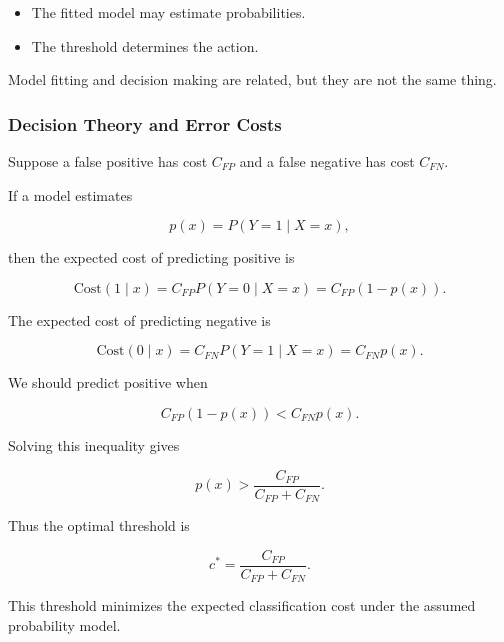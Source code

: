 \documentclass[
  letterpaper,
  DIV=11,
  numbers=noendperiod]{scrreprt}
\providecommand{\tightlist}{%
  \setlength{\itemsep}{0pt}\setlength{\parskip}{0pt}}
\theoremstyle{definition}
\theoremstyle{definition}
\theoremstyle{plain}
\theoremstyle{plain}
\theoremstyle{remark}
\begin{document}
\begin{tcolorbox}[enhanced jigsaw, arc=.35mm, bottomrule=.15mm, bottomtitle=1mm, breakable, colback=white, colbacktitle=quarto-callout-note-color!10!white, colframe=quarto-callout-note-color-frame, coltitle=black, left=2mm, leftrule=.75mm, opacityback=0, opacitybacktitle=0.6, rightrule=.15mm, title=\textcolor{quarto-callout-note-color}{\faInfo}\hspace{0.5em}{Thresholds are decisions}, titlerule=0mm, toprule=.15mm, toptitle=1mm]

\begin{itemize}
\tightlist
\item
  The fitted model may estimate probabilities.
\item
  The threshold determines the action.
\end{itemize}

Model fitting and decision making are related, but they are not the same
thing.

\end{tcolorbox}

\subsubsection{Decision Theory and Error
Costs}\label{decision-theory-and-error-costs}

Suppose a false positive has cost \(C_{FP}\) and a false negative has
cost \(C_{FN}\).

If a model estimates

\[
p(x)=P(Y=1\mid X=x),
\]

then the expected cost of predicting positive is

\[
\text{Cost}(1\mid x)
=
C_{FP}P(Y=0\mid X=x)
=
C_{FP}(1-p(x)).
\]

The expected cost of predicting negative is

\[
\text{Cost}(0\mid x)
=
C_{FN}P(Y=1\mid X=x)
=
C_{FN}p(x).
\]

We should predict positive when

\[
C_{FP}(1-p(x))
<
C_{FN}p(x).
\]

Solving this inequality gives

\[
p(x)
>
\frac{C_{FP}}{C_{FP}+C_{FN}}.
\]

Thus the optimal threshold is

\[
c^*
=
\frac{C_{FP}}{C_{FP}+C_{FN}}.
\]

This threshold minimizes the expected classification cost under the
assumed probability model.
\end{document}

